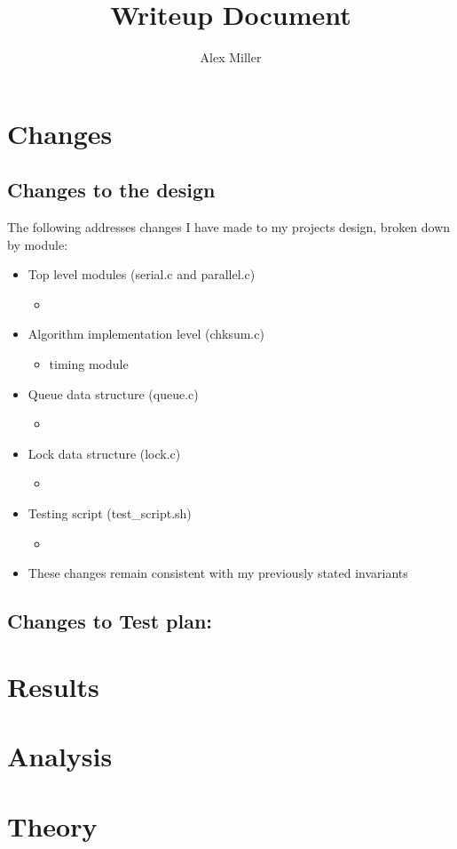 \documentclass[]{article}
\title{Writeup Document}
\author{Alex Miller}
\begin{document}
\maketitle

\section{Changes}
\subsection{Changes to the design}
The following addresses changes I have made to my projects design, broken down by module:
\begin{itemize}
	\item Top level modules (serial.c and parallel.c)
	\begin{itemize}
		\item 
	\end{itemize}
	\item Algorithm implementation level (chksum.c)
	\begin{itemize}
		\item timing module
	\end{itemize}
	\item Queue data structure (queue.c)
	\begin{itemize}
		\item 
	\end{itemize}
	\item Lock data structure (lock.c)
	\begin{itemize}
		\item 
	\end{itemize}
	\item Testing script (test\_script.sh)
	\begin{itemize}
		\item
	\end{itemize}
	\item These changes remain consistent with my previously stated invariants
\end{itemize}

\subsection{Changes to Test plan:}

\section{Results}

\section{Analysis}

\section{Theory}
	
\end{document}

